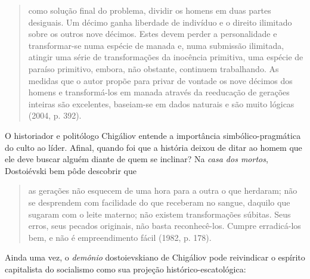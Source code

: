 \begin{quote}
como solução final do problema, dividir os homens em duas partes
desiguais. Um décimo ganha liberdade de indivíduo e o direito ilimitado
sobre os outros nove décimos. Estes devem perder a personalidade e
transformar-se numa espécie de manada e, numa submissão ilimitada,
atingir uma série de transformações da inocência primitiva, uma espécie
de paraíso primitivo, embora, não obstante, continuem trabalhando. As
medidas que o autor propõe para privar de vontade os nove décimos dos
homens e transformá-los em manada através da reeducação de gerações
inteiras são excelentes, baseiam-se em dados naturais e são muito
lógicas (2004, p. 392).
\end{quote}

O historiador e politólogo Chigáliov entende a importância
simbólico-pragmática do culto ao líder. Afinal, quando foi que a
história deixou de ditar ao homem que ele deve buscar alguém diante de
quem se inclinar? Na \emph{casa dos mortos}, Dostoiévski bem pôde
descobrir que

\begin{quote}
as gerações não esquecem de uma hora para a outra o que herdaram; não se
desprendem com facilidade do que receberam no sangue, daquilo que
sugaram com o leite materno; não existem transformações súbitas. Seus
erros, seus pecados originais, não basta reconhecê-los. Cumpre
erradicá-los bem, e não é empreendimento fácil (1982, p. 178).
\end{quote}

Ainda uma vez, o \emph{demônio} dostoievskiano de Chigáliov pode
reivindicar o espírito capitalista do socialismo como sua projeção
histórico-escatológica:

